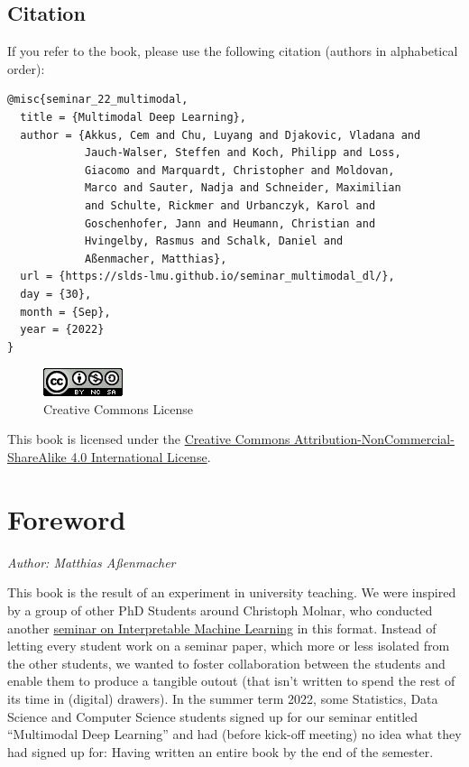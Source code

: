 \documentclass[
]{krantz}
\begin{document}
\hypertarget{citation}{%
\section*{Citation}\label{citation}}


If you refer to the book, please use the following citation (authors in alphabetical order):

\begin{verbatim}
@misc{seminar_22_multimodal,
  title = {Multimodal Deep Learning},
  author = {Akkus, Cem and Chu, Luyang and Djakovic, Vladana and
            Jauch-Walser, Steffen and Koch, Philipp and Loss,
            Giacomo and Marquardt, Christopher and Moldovan,
            Marco and Sauter, Nadja and Schneider, Maximilian
            and Schulte, Rickmer and Urbanczyk, Karol and
            Goschenhofer, Jann and Heumann, Christian and
            Hvingelby, Rasmus and Schalk, Daniel and
            Aßenmacher, Matthias},
  url = {https://slds-lmu.github.io/seminar_multimodal_dl/},
  day = {30},
  month = {Sep},
  year = {2022}
}
\end{verbatim}

\begin{figure}
\centering
\includegraphics{figures/by-nc-sa.png}
\caption{Creative Commons License}
\end{figure}

This book is licensed under the \href{http://creativecommons.org/licenses/by-nc-sa/4.0/}{Creative Commons Attribution-NonCommercial-ShareAlike 4.0 International License}.

\mainmatter

\hypertarget{foreword}{%
\chapter*{Foreword}\label{foreword}}


\emph{Author: Matthias Aßenmacher}

This book is the result of an experiment in university teaching. We were inspired by a group of other PhD Students around Christoph Molnar, who conducted another \href{https://compstat-lmu.github.io/iml_methods_limitations/}{seminar on Interpretable Machine Learning} in this format.
Instead of letting every student work on a seminar paper, which more or less isolated from the other students, we wanted to foster collaboration between the students and enable them to produce a tangible outout (that isn't written to spend the rest of its time in (digital) drawers).
In the summer term 2022, some Statistics, Data Science and Computer Science students signed up for our seminar entitled ``Multimodal Deep Learning'' and had (before kick-off meeting) no idea what they had signed up for: Having written an entire book by the end of the semester.
\end{document}

